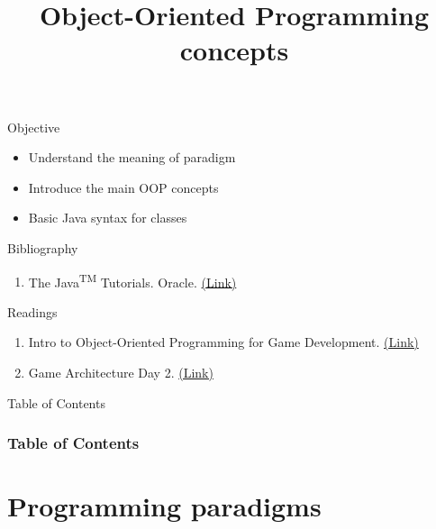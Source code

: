\documentclass[10pt,compress]{beamer} %
\title[OOP concepts]{Object-Oriented Programming concepts}
\author{}
\institute{\asignatura}
\date{}
\begin{document}
{\titlepageBlue
    \begin{frame}
        \titlepage
    \end{frame}
}

\begin{frame}[plain]{}
   \begin{block}{Objective}
   \begin{itemize}
   		\item Understand the meaning of paradigm
   		\item Introduce the main OOP concepts
		\item Basic Java syntax for classes
	\end{itemize}
	\end{block}

   \begin{block}{Bibliography}
      \begin{enumerate}
          \item The Java\textsuperscript{TM} Tutorials. Oracle. \href{https://docs.oracle.com/javase/tutorial/}{(Link)}
      \end{enumerate} 
   \end{block}

   \begin{block}{Readings}
      \begin{enumerate}
          \item Intro to Object-Oriented Programming for Game Development. \href{https://gamedevelopment.tutsplus.com/tutorials/quick-tip-intro-to-object-oriented-programming-for-game-development--gamedev-1805}{(Link)}
          \item Game Architecture Day 2. \href{http://blog.nuclex-games.com/2010/01/game-architecture-day-2/}{(Link)}
      \end{enumerate} 
   \end{block}
\end{frame}

{
\begin{frame}[shrink]{Table of Contents}
 \frametitle{Table of Contents}
 \tableofcontents
\end{frame}
}

\section[Programming paradigms]{Programming paradigms}
\end{document}
